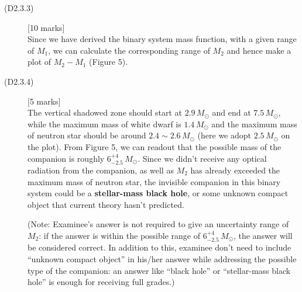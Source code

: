 \begin{description}
\item[(D2.3.3)] \hfill[10 marks]\\
  Since we have derived the binary system mass function, with a given range
  of $M_1$, we can calculate the corresponding range of $M_2$ and hence make
  a plot of $M_2 - M_1$ (Figure 5).

\item[(D2.3.4)] \hfill[5 marks]\\
  The vertical shadowed zone should start at $2.9\,M_\odot$ and end at
  $7.5\,M_\odot$, while the maximum mass of white dwarf is $1.4\,M_\odot$ and
  the maximum mass of neutron star should be around $2.4 \sim 2.6\,M_\odot$
  (here we adopt $2.5\,M_\odot$ on the plot). From Figure 5, we can readout
  that the possible mass of the companion is roughly
  $6^{+4}_{-2.5}\,M_\odot$. Since we didn't receive any optical radiation
  from the companion, as well as $M_2$ has already exceeded the maximum mass
  of neutron star, the invisible companion in this binary system could be a
  \textbf{stellar-mass black hole}, or some unknown compact object that
  current theory hasn't predicted.

  (Note: Examinee's answer is not required to give an uncertainty range of
  $M_2$: if the answer is within the possible range of
  $6^{+4}_{-2.5}\,M_\odot$, the answer will be considered correct. In
  addition to this, examinee don't need to include ``unknown compact
  object'' in his/her answer while addressing the possible type of the
  companion: an answer like ``black hole'' or ``stellar-mass black hole'' is
  enough for receiving full grades.)
\end{description}


